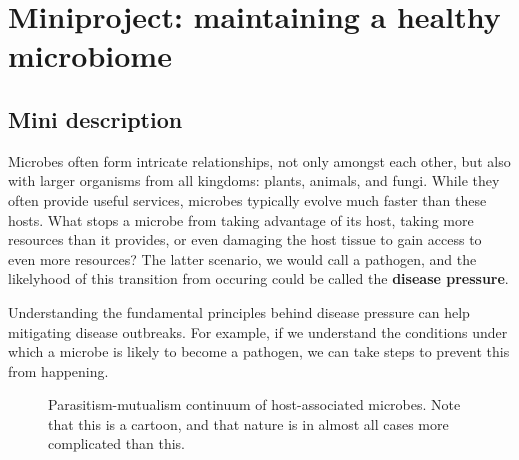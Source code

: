 \documentclass[
  letterpaper,
  DIV=11,
  numbers=noendperiod]{scrreprt}
\theoremstyle{definition}
\theoremstyle{remark}
\begin{document}
\chapter{Miniproject: maintaining a healthy
microbiome}\label{miniproject-maintaining-a-healthy-microbiome}

\section{Mini description}\label{mini-description}

Microbes often form intricate relationships, not only amongst each
other, but also with larger organisms from all kingdoms: plants,
animals, and fungi. While they often provide useful services, microbes
typically evolve much faster than these hosts. What stops a microbe from
taking advantage of its host, taking more resources than it provides, or
even damaging the host tissue to gain access to even more resources? The
latter scenario, we would call a pathogen, and the likelyhood of this
transition from occuring could be called the \textbf{disease pressure}.

Understanding the fundamental principles behind disease pressure can
help mitigating disease outbreaks. For example, if we understand the
conditions under which a microbe is likely to become a pathogen, we can
take steps to prevent this from happening.

\begin{figure}


\caption{\label{fig-parmut}Parasitism-mutualism continuum of
host-associated microbes. Note that this is a cartoon, and that nature
is in almost all cases more complicated than this.}

\end{figure}%
\end{document}
